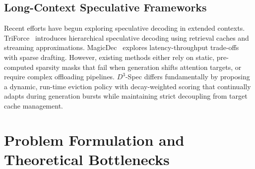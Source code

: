 \documentclass[runningheads]{llncs}
\begin{document}
\subsection{Long-Context Speculative Frameworks}
Recent efforts have begun exploring speculative decoding in extended contexts. TriForce~\cite{sun2024triforce} introduces hierarchical speculative decoding using retrieval caches and streaming approximations. MagicDec~\cite{chen2024magicdec} explores latency-throughput trade-offs with sparse drafting. However, existing methods either rely on static, pre-computed sparsity masks that fail when generation shifts attention targets, or require complex offloading pipelines. $D^3$-Spec differs fundamentally by proposing a dynamic, run-time eviction policy with decay-weighted scoring that continually adapts during generation bursts while maintaining strict decoupling from target cache management.

\section{Problem Formulation and Theoretical Bottlenecks}
\label{sec:formulation}
\end{document}
